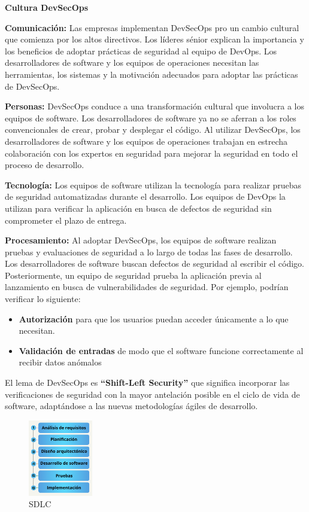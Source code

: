 \textbf{Cultura DevSecOps}

\textbf{Comunicación:} Las empresas implementan DevSecOps pro un cambio cultural que comienza por los altos directivos. Los líderes sénior explican la importancia y los beneficios de adoptar prácticas de seguridad al equipo de DevOps. Los desarrolladores de software y los equipos de operaciones necesitan las herramientas, los sistemas y la motivación adecuados para adoptar las prácticas de DevSecOps. 

\textbf{Personas:} DevSecOps conduce a una transformación cultural que involucra a los equipos de software. Los desarrolladores de software ya no se aferran a los roles convencionales de crear, probar y desplegar el código. Al utilizar DevSecOps, los desarrolladores de software y los equipos de operaciones trabajan en estrecha colaboración con los expertos en seguridad para mejorar la seguridad en todo el proceso de desarrollo. 

\textbf{Tecnología:} Los equipos de software utilizan la tecnología para realizar pruebas de seguridad automatizadas durante el desarrollo. Los equipos de DevOps la utilizan para verificar la aplicación en busca de defectos de seguridad sin comprometer el plazo de entrega. 

\textbf{Procesamiento:} Al adoptar DevSecOps, los equipos de software realizan pruebas y evaluaciones de seguridad a lo largo de todas las fases de desarrollo. Los desarrolladores de software buscan defectos de seguridad al escribir el código. Posteriormente, un equipo de seguridad prueba la aplicación previa al lanzamiento en busca de vulnerabilidades de seguridad. Por ejemplo, podrían verificar lo siguiente:
\begin{itemize}
    \item \textbf{Autorización} para que los usuarios puedan acceder únicamente a lo que necesitan.
    \item \textbf{Validación de entradas} de modo que el software funcione correctamente al recibir datos anómalos 
\end{itemize}

El lema de DevSecOps es \textbf{“Shift-Left Security”} que significa incorporar las verificaciones de seguridad con la mayor antelación posible en el ciclo de vida de software, adaptándose a las nuevas metodologías ágiles de desarrollo.\cite{aws_devsecops}

\vspace{0.3cm}

\begin{figure}[ht] %
    \centering
    \includegraphics[width=0.25\textwidth]{Imágenes/SDLC.png}
    \caption{SDLC}
    \label{fig:Ciclo_de_vida_de_desarrollo_de_softwareSDLC}
\end{figure}

